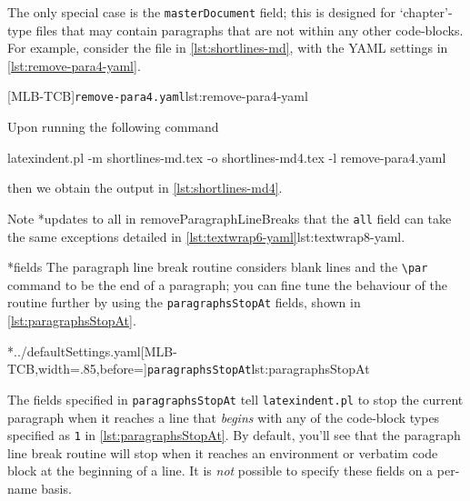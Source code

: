 	The only special case is the \texttt{masterDocument} field; this is designed for
	`chapter'-type files that may contain paragraphs that are not within any other
	code-blocks. For example, consider the file in \cref{lst:shortlines-md}, with the YAML
	settings in \cref{lst:remove-para4-yaml}.

        \begin{cmhtcbraster}
		[MLB-TCB]{\texttt{remove-para4.yaml}}{lst:remove-para4-yaml}
        \end{cmhtcbraster}

	Upon running the following command
	\begin{widepage}
		\begin{commandshell}
latexindent.pl -m shortlines-md.tex -o shortlines-md4.tex -l remove-para4.yaml
\end{commandshell}
	\end{widepage}
	then we obtain the output in \cref{lst:shortlines-md4}. 

	Note%
	*{updates to all in removeParagraphLineBreaks} that the
	\texttt{all} field can take the same exceptions detailed in
	\cref{lst:textwrap6-yaml}{lst:textwrap8-yaml}.

*{fields}
	The paragraph line break routine considers blank lines and the
	\lstinline|\par| command to be the end of a paragraph;
	 you can fine tune the behaviour of the routine further by
	using the \texttt{paragraphsStopAt} fields, shown in \cref{lst:paragraphsStopAt}.

	\cmhlistingsfromfile[style=paragraphsStopAt]*{../defaultSettings.yaml}[MLB-TCB,width=.85\linewidth,before=\centering]{\texttt{paragraphsStopAt}}{lst:paragraphsStopAt}

	The fields specified in \texttt{paragraphsStopAt} tell \texttt{latexindent.pl} to
	stop the current paragraph when it reaches a line that \emph{begins} with
	any of the code-block types specified as \texttt{1} in
	\cref{lst:paragraphsStopAt}. By default, you'll see that the paragraph line break routine
	will stop when it reaches an environment or verbatim code block at the beginning of a
	line. It is \emph{not} possible to specify these fields on a per-name
	basis.

